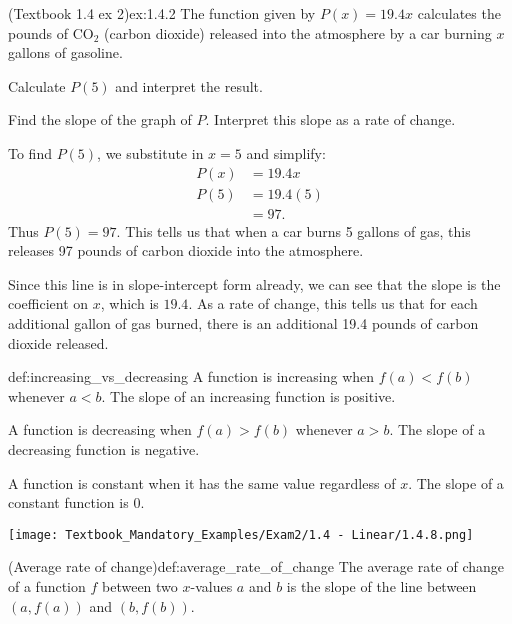 \documentclass{article}
\begin{document}
\begin{example}{(Textbook 1.4 ex 2)}{ex:1.4.2}
    The function given by $P(x)=19.4x$ calculates the pounds of $\text{CO}_2$ (carbon dioxide) released into the atmosphere by a car burning $x$ gallons of gasoline.
    \begin{problem}
        \item Calculate $P(5)$ and interpret the result.
        \item Find the slope of the graph of $P$. Interpret this slope as a rate of change.
    \end{problem}
\end{example}
\begin{solution}
    \begin{problem}
        \item To find $P(5)$, we substitute in $x=5$ and simplify:
        \begin{align*}
            P(x)&=19.4x\\
            P(5)&=19.4(5)\\
            &=97.
        \end{align*}
        Thus $P(5)=97$. This tells us that when a car burns 5 gallons of gas, this releases 97 pounds of carbon dioxide into the atmosphere.
        \item Since this line is in slope-intercept form already, we can see that the slope is the coefficient on $x$, which is $19.4$. As a rate of change, this tells us that for each additional gallon of gas burned, there is an additional 19.4 pounds of carbon dioxide released.
    \end{problem}
\end{solution}

\begin{definition}{}{def:increasing_vs_decreasing}
    A function is increasing when $f(a)<f(b)$ whenever $a<b$. The slope of an increasing function is positive.

    A function is decreasing when $f(a)>f(b)$ whenever $a>b$. The slope of a decreasing function is negative.

    A function is constant when it has the same value regardless of $x$. The slope of a constant function is 0.
\end{definition}

\texttt{[image: Textbook\_Mandatory\_Examples/Exam2/1.4 - Linear/1.4.8.png]}

\begin{definition}{(Average rate of change)}{def:average_rate_of_change}
    The average rate of change of a function $f$ between two $x$-values $a$ and $b$ is the slope of the line between $(a,f(a))$ and $(b,f(b))$.
\end{definition}
\end{document}
